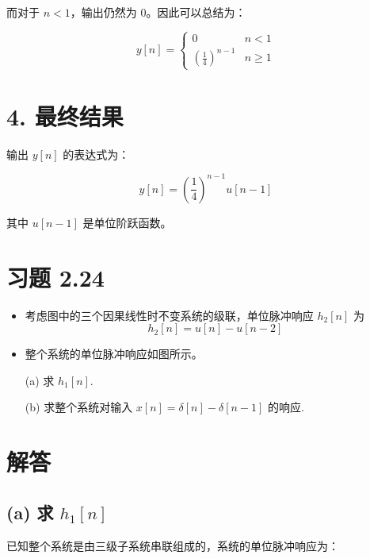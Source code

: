 \documentclass[UTF8]{report}
\theoremstyle{MyLineTheoremStyle} %
\theoremstyle{MyBlockTheoremStyle} %
\theoremstyle{MySubsubsectionStyle} %
\begin{document}
而对于 $n < 1$，输出仍然为 0。因此可以总结为：

\begin{equation}
    y[n] = 
    \begin{cases} 
    0 & n < 1 \\ 
    \left(\frac{1}{4}\right)^{n-1} & n \geq 1 
    \end{cases}
\end{equation}

\section*{4. 最终结果}

输出 $y[n]$ 的表达式为：

\begin{equation}
    y[n] = \left(\frac{1}{4}\right)^{n-1} u[n-1]
\end{equation}

其中 $u[n-1]$ 是单位阶跃函数。




\section{习题 2.24}
\begin{itemize}
    \item 考虑图中的三个因果线性时不变系统的级联，单位脉冲响应 $h_2[n]$ 为
    \begin{equation}
        h_2[n] = u[n] - u[n-2]
    \end{equation}
    \item 整个系统的单位脉冲响应如图所示。
\end{itemize}

\begin{itemize}
    \item[(a)] 求 $h_1[n]$.
    \item[(b)] 求整个系统对输入 $x[n] = \delta[n] - \delta[n-1]$ 的响应.
\end{itemize}


\section*{解答}

\subsection*{(a) 求 $h_1[n]$}

已知整个系统是由三级子系统串联组成的，系统的单位脉冲响应为：
\end{document}
